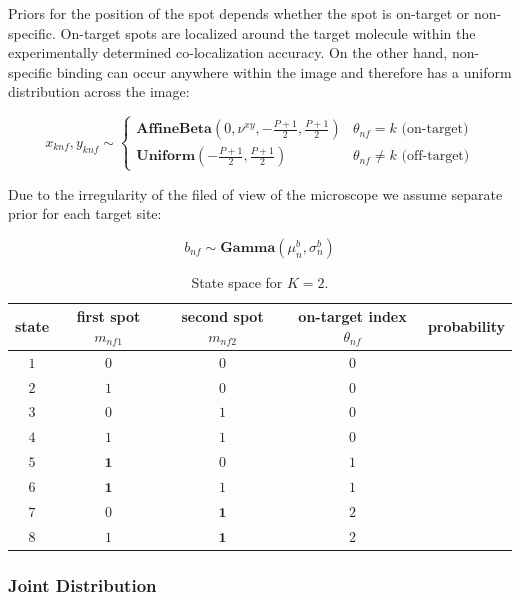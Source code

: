 Priors for the position of the spot depends whether the spot is on-target or non-specific. On-target spots are localized around the target molecule within the experimentally determined co-localization accuracy. On the other hand, non-specific binding can occur anywhere within the image and therefore has a uniform distribution across the image:

\begin{equation}
    x_{knf}, y_{knf} \sim
    \begin{cases}
    \textbf{AffineBeta}(0, \nu^{xy}, -\frac{P+1}{2}, \frac{P+1}{2}) & \text{$\theta_{nf} = k$ (on-target)} \\
    \textbf{Uniform}(-\frac{P+1}{2}, \frac{P+1}{2}) & \text{$\theta_{nf} \neq k$ (off-target)}
    \end{cases}
\end{equation}

Due to the irregularity of the filed of view of the microscope we assume separate prior for each target site:

\begin{equation}
    b_{nf} \sim \textbf{Gamma}(\mu^b_n, \sigma^b_n)
\end{equation}

\begin{table}
\caption{\label{tab:states}State space for $K = 2$.}
\begin{tabular}{c c c c c}
\toprule
state   & first spot $m_{nf1}$ & second spot $m_{nf2}$ & on-target index $\theta_{nf}$  & probability \\
\midrule
$1$       & $0$     & $0$     & $0$         &  \\
$2$       & $1$     & $0$     & $0$         &  \\
$3$       & $0$     & $1$     & $0$         &  \\
$4$       & $1$     & $1$     & $0$         &  \\
$5$       & $\mathbf{1}$    & $0$     & $1$         &  \\
$6$       & $\mathbf{1}$    & $1$     & $1$         &  \\
$7$       & $0$     & $\mathbf{1}$    & $2$         &  \\
$8$       & $1$     & $\mathbf{1}$    & $2$         &  \\
\bottomrule
\end{tabular}
\end{table}

\subsubsection{Joint Distribution}

